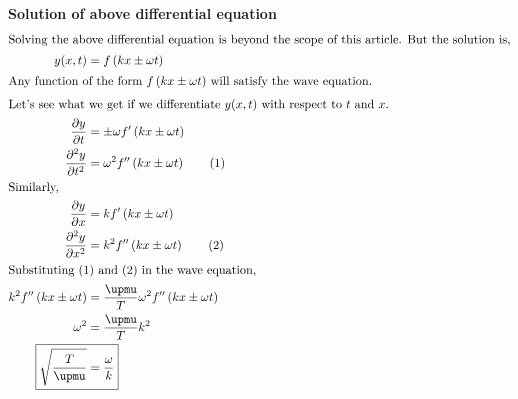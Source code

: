     \item \textbf{Solution of above differential equation}
    \begin{align*}
        \intertext{Solving the above differential equation is beyond the scope of this article. But the solution is,}
        y(x, t) &= f\left(k x \pm \omega t\right)\\
        \intertext{Any function of the form $f\left(k x \pm \omega t\right)$ will satisfy the wave equation.}
        \intertext{Let's see what we get if we differentiate $y(x, t)$ with respect to $t$ and $x$.}
        \dfrac{\partial{y}}{\partial{t}} &= \pm \omega f'\left(k x \pm \omega t\right)\\
        \dfrac{\partial^2{y}}{\partial{t^2}} &= \omega^2 f''\left(k x \pm \omega t\right)\tag{1}\\
        \intertext{Similarly,}
        \dfrac{\partial{y}}{\partial{x}} &= k f'\left(k x \pm \omega t\right)\\
        \dfrac{\partial^2{y}}{\partial{x^2}} &= k^2 f''\left(k x \pm \omega t\right)\tag{2}\\
        \intertext{Substituting (1) and (2) in the wave equation,}
        k^2 f''\left(k x \pm \omega t\right) &= \dfrac{\upmu}{T} \omega^2 f''\left(k x \pm \omega t\right)\\
        \omega^2 &= \dfrac{\upmu}{T} k^2\\
        \Aboxed{\sqrt{\dfrac{T}{\upmu}} &= \dfrac{\omega}{k}} \\
    \end{align*}
    \pagebreak

